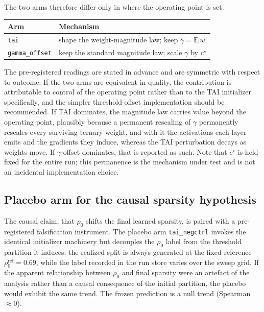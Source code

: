 \documentclass[final,5p,times,twocolumn]{elsarticle}
\theoremstyle{remark}
\newcommand{\E}{\mathbb{E}}
\newcommand{\rhoz}{\rho_{0}}
\begin{document}
The two arms therefore differ only in where the operating point is set:
\begin{center}
\small
\begin{tabular}{@{}lp{}@{}}
\toprule
\textbf{Arm} & \textbf{Mechanism} \\
\midrule
\texttt{tai} & shape the weight-magnitude law; keep $\gamma = \E|w|$ \\
\texttt{gamma\_offset} & keep the standard magnitude law; scale $\gamma$ by $c^{\star}$ \\
\bottomrule
\end{tabular}
\end{center}

The pre-registered readings are stated in advance and are symmetric with
respect to outcome. If the two arms are equivalent in quality, the contribution
is attributable to control of the operating point rather than to the TAI
initializer specifically, and the simpler threshold-offset implementation should
be recommended. If TAI dominates, the magnitude law carries value beyond the
operating point, plausibly because a permanent rescaling of $\gamma$
permanently rescales every surviving ternary weight, and with it the
activations each layer emits and the gradients they induce, whereas the TAI
perturbation decays as weights move. If $\gamma$-offset dominates, that is
reported as such. Note that $c^{\star}$ is held fixed for the entire run;
this permanence is the mechanism under test and is not an incidental
implementation choice.

\subsection{Placebo arm for the causal sparsity hypothesis}
\label{sec:placebo}

The causal claim, that $\rhoz$ shifts the final learned sparsity, is
paired with a pre-registered falsification instrument. The placebo arm
\texttt{tai\_negctrl} invokes the identical initializer machinery but decouples
the $\rhoz$ label from the threshold partition it induces: the realized
split is always generated at the fixed reference $\rhoz^{\mathrm{ref}} = 0.69$,
while the label recorded in the run store varies over the sweep grid. If the
apparent relationship between $\rhoz$ and final sparsity were an artefact of the
analysis rather than a causal consequence of the initial partition, the placebo
would exhibit the same trend. The frozen prediction is a null trend
(Spearman $\approx 0$).
\end{document}
